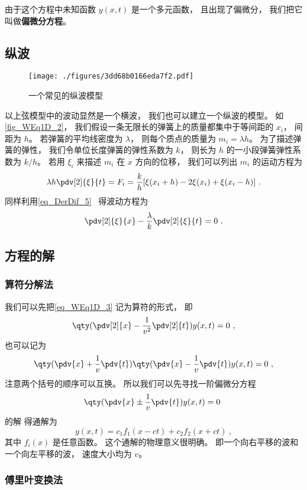 由于这个方程中未知函数 $y(x,t)$ 是一个多元函数， 且出现了偏微分， 我们把它叫做\textbf{偏微分方程}。

\subsection{纵波}

\begin{figure}[ht]
\centering
\texttt{[image: ./figures/3dd68b0166eda7f2.pdf]}
\caption{一个常见的纵波模型} \label{fig_WEq1D_2}
\end{figure}

以上弦模型中的波动显然是一个横波， 我们也可以建立一个纵波的模型。 如\autoref{fig_WEq1D_2}， 我们假设一条无限长的弹簧上的质量都集中于等间距的 $x_i$， 间距为 $h$。 若弹簧的平均线密度为 $\lambda$， 则每个质点的质量为 $m_i = \lambda h$。 为了描述弹簧的弹性， 我们令单位长度弹簧的弹性系数为 $k$， 则长为 $h$ 的一小段弹簧弹性系数为 $k/h$。 若用 $\xi_i$ 来描述 $m_i$ 在 $x$ 方向的位移， 我们可以列出 $m_i$ 的运动方程为
\begin{equation}
\lambda h \pdv[2]{\xi}{t} = F_i = \frac kh [\xi(x_i + h) - 2\xi(x_i) + \xi(x_i - h)]~.
\end{equation}
同样利用\autoref{eq_DerDif_5}~ 得波动方程为
\begin{equation}
\pdv[2]{\xi}{x} - \frac{\lambda}{k}\pdv[2]{\xi}{t} = 0~.
\end{equation}

\subsection{方程的解}

\subsubsection{算符分解法}
我们可以先把\autoref{eq_WEq1D_3} 记为算符的形式， 即
\begin{equation}
\qty(\pdv[2]{x} - \frac{1}{v^2}\pdv[2]{t}) y(x, t) = 0~,
\end{equation}
也可以记为
\begin{equation}
\qty(\pdv{x} + \frac{1}{v}\pdv{t})\qty(\pdv{x} - \frac{1}{v}\pdv{t}) y(x, t) = 0~,
\end{equation}
注意两个括号的顺序可以互换。 所以我们可以先寻找一阶偏微分方程
\begin{equation}
\qty(\pdv{x}  \pm\frac{1}{v}\pdv{t})y(x, t)  = 0~
\end{equation}
的解%
得通解为
\begin{equation}
y(x, t) = c_1 f_1(x - ct) + c_2 f_2(x + ct)~,
\end{equation}
其中 $f_i(x)$ 是任意函数。 这个通解的物理意义很明确。 即一个向右平移的波和一个向左平移的波， 速度大小均为 $v$。

\subsubsection{傅里叶变换法}
